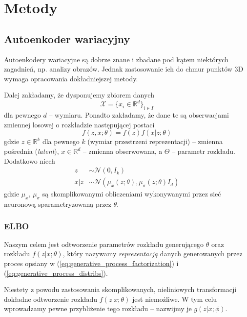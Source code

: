 \documentclass[12pt]{extarticle}
\begin{document}
\section{Metody}
\subsection{Autoenkoder wariacyjny}
\label{sec:vae_method}
Autoenkodery wariacyjne są dobrze znane i zbadane pod kątem niektórych zagadnień,
np. analizy obrazów. Jednak zastosowanie ich do chmur punktów 3D wymaga opracowania
dokładniejszej metody.

Dalej zakładamy, że dysponujemy zbiorem danych
$$
\mathcal{X} = \{x_i \in \mathbb{R}^{d}\}_{i \in I}
$$
dla pewnego $d$ -- wymiaru. Ponadto zakładamy, że dane te są obserwacjami
zmiennej losowej o rozkładzie następującej postaci
\begin{equation}
f(z, x; \theta) = f(z)f(x|z; \theta)
\label{eq:generative_process_factorization}
\end{equation}
gdzie $z \in \mathbb{R}^k$ dla pewnego $k$ (wymiar przestrzeni reprezentacji) -- zmienna pośrednia (\textit{latent}), $x \in \mathbb{R}^d$ -- zmienna obserwowana,
a $\Theta$ -- parametr rozkładu. Dodatkowo niech
\begin{equation}
\begin{split}
z &\sim \mathcal{N}(0, I_k) \\
x|z &\sim \mathcal{N}(\mu_x(z; \theta), \mu_\sigma(z;\theta)I_d)
\end{split}
\label{eq:generative_process_distribs}
\end{equation}
gdzie $\mu_x,\,\mu_{\sigma}$ są skomplikowanymi obliczeniami
wykonywanymi przez sieć neuronową sparametryzowaną przez $\theta$.

\subsubsection{ELBO}
Naszym celem jest odtworzenie parametrów rozkładu generującego $\theta$
oraz rozkładu $f(z|x; \theta)$, który nazywamy \textit{reprezentacją} danych
generowanych przez proces opsiany w
(\ref{eq:generative_process_factorization}) i (\ref{eq:generative_process_distribs}).

Niestety z powodu zastosowania skomplikowanych, nieliniowych
transformacji dokładne odtworzenie rozkładu $f(z|x; \theta)$ jest niemożliwe.
W tym celu wprowadzamy pewne przybliżenie tego rozkładu -- nazwijmy je
$g(z|x; \phi)$.
\end{document}
